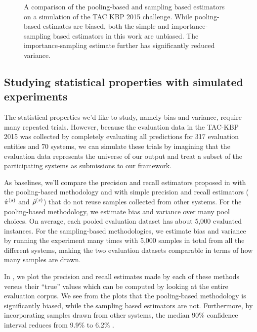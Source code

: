 \begin{figure}[t]
\begin{subfigure}{0.49\textwidth}
  \end{subfigure}
  \caption{\label{fig:simulation}
  A comparison of the pooling-based and sampling based estimators on a simulation of the TAC KBP 2015 challenge.
  While pooling-based estimates are biased, both the simple and importance-sampling based estimators in this work are unbiased.
  The importance-sampling estimate further has significantly reduced variance. 
  }
\end{figure}

\subsection{Studying statistical properties with simulated experiments}
The statistical properties we'd like to study, namely bias and variance, require many repeated trials.
However, because the evaluation data in the TAC-KBP 2015 was collected by completely evaluating all predictions for 317 evaluation entities and 70 systems, we can simulate these trials by imagining that the evaluation data represents the universe of our output and treat a subset of the participating systems as submissions to our framework.

As baselines, we'll compare the precision and recall estimators proposed in  with the pooling-based methodology and with simple precision and recall estimators (${\hat{\pi}}^{(s)}$ and ${\hat{\rho}}^{(s)}$) that do not reuse samples collected from other systems.
For the pooling-based methodology, we estimate bias and variance over many pool choices.
  On average, each pooled evaluation dataset has about 5,000 evaluated instances.
For the sampling-based methodologies, we estimate bias and variance by running the experiment many times with 5,000 samples in total from all the different systems, making the two evaluation datasets comparable in terms of how many samples are drawn.

In , we plot the precision and recall estimates made by each of these methods versus their ``true'' values which can be computed by looking at the entire evaluation corpus.
We see from the plots that the pooling-based methodology is significantly biased, while the sampling based estimators are not.
Furthermore, by incorporating samples drawn from other systems, the median 90\% confidence interval reduces from 9.9\% \fone{} to 6.2\% \fone{}.

